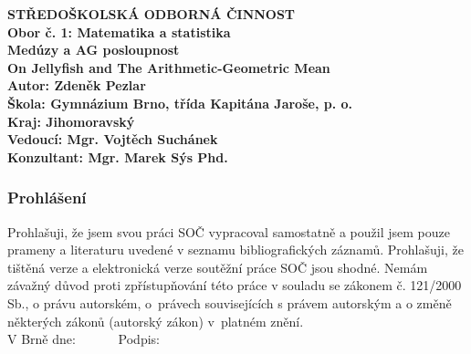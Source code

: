 \documentclass[12pt]{report}
\begin{document}
\begin{titlepage}
{
\centering
\LARGE \textbf{STŘEDOŠKOLSKÁ ODBORNÁ ČINNOST}\\
\Large\textbf{Obor č. 1: Matematika a statistika}\\
\vspace{6cm}
\LARGE\textbf{Medúzy a AG posloupnost}\\
\vspace{1cm}
\LARGE\textbf{On Jellyfish and The Arithmetic-Geometric Mean}\\
}
\vspace{6cm}
{\noindent\large\bfseries Autor: Zdeněk Pezlar\\ 
	\large\bfseries Škola: Gymnázium Brno, třída Kapitána Jaroše, p. o.\\
    \large\bfseries Kraj: Jihomoravský \\
	\large\bfseries Vedoucí: Mgr. Vojtěch Suchánek\\
	 \large\bfseries Konzultant: Mgr. Marek Sýs Phd.	
	}
	

\end{titlepage}

\newpage
\thispagestyle{empty}
\vspace*{14cm}
\subsubsection*{Prohlášení}

Prohlašuji, že jsem svou práci SOČ vypracoval samostatně a použil jsem pouze prameny a literaturu uvedené v seznamu bibliografických záznamů.
Prohlašuji, že tištěná verze a elektronická verze soutěžní práce SOČ jsou shodné. 
Nemám závažný důvod proti zpřístupňování této práce v souladu se zákonem č. 121/2000 Sb., o právu autorském, o~právech souvisejících s právem autorským a o změně některých zákonů (autorský zákon) v~platném znění. \\[1cm]
V Brně dne: \dotfill \ \ \ \ \ \  Podpis: \dotfill
\end{document}

